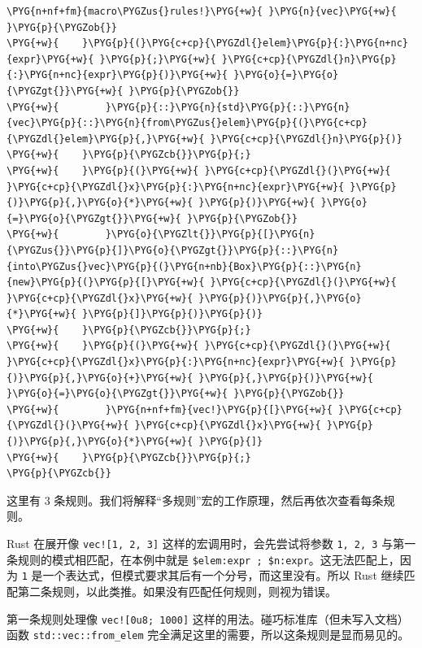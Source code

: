 \begin{Verbatim}[commandchars=\\\{\},breaklines=true,breakanywhere=true,fontsize=\codefont,xleftmargin=17bp]
\PYG{n+nf+fm}{macro\PYGZus{}rules!}\PYG{+w}{ }\PYG{n}{vec}\PYG{+w}{ }\PYG{p}{\PYGZob{}}
\PYG{+w}{    }\PYG{p}{(}\PYG{c+cp}{\PYGZdl{}elem}\PYG{p}{:}\PYG{n+nc}{expr}\PYG{+w}{ }\PYG{p}{;}\PYG{+w}{ }\PYG{c+cp}{\PYGZdl{}n}\PYG{p}{:}\PYG{n+nc}{expr}\PYG{p}{)}\PYG{+w}{ }\PYG{o}{=}\PYG{o}{\PYGZgt{}}\PYG{+w}{ }\PYG{p}{\PYGZob{}}
\PYG{+w}{        }\PYG{p}{::}\PYG{n}{std}\PYG{p}{::}\PYG{n}{vec}\PYG{p}{::}\PYG{n}{from\PYGZus{}elem}\PYG{p}{(}\PYG{c+cp}{\PYGZdl{}elem}\PYG{p}{,}\PYG{+w}{ }\PYG{c+cp}{\PYGZdl{}n}\PYG{p}{)}
\PYG{+w}{    }\PYG{p}{\PYGZcb{}}\PYG{p}{;}
\PYG{+w}{    }\PYG{p}{(}\PYG{+w}{ }\PYG{c+cp}{\PYGZdl{}(}\PYG{+w}{ }\PYG{c+cp}{\PYGZdl{}x}\PYG{p}{:}\PYG{n+nc}{expr}\PYG{+w}{ }\PYG{p}{)}\PYG{p}{,}\PYG{o}{*}\PYG{+w}{ }\PYG{p}{)}\PYG{+w}{ }\PYG{o}{=}\PYG{o}{\PYGZgt{}}\PYG{+w}{ }\PYG{p}{\PYGZob{}}
\PYG{+w}{        }\PYG{o}{\PYGZlt{}}\PYG{p}{[}\PYG{n}{\PYGZus{}}\PYG{p}{]}\PYG{o}{\PYGZgt{}}\PYG{p}{::}\PYG{n}{into\PYGZus{}vec}\PYG{p}{(}\PYG{n+nb}{Box}\PYG{p}{::}\PYG{n}{new}\PYG{p}{(}\PYG{p}{[}\PYG{+w}{ }\PYG{c+cp}{\PYGZdl{}(}\PYG{+w}{ }\PYG{c+cp}{\PYGZdl{}x}\PYG{+w}{ }\PYG{p}{)}\PYG{p}{,}\PYG{o}{*}\PYG{+w}{ }\PYG{p}{]}\PYG{p}{)}\PYG{p}{)}
\PYG{+w}{    }\PYG{p}{\PYGZcb{}}\PYG{p}{;}
\PYG{+w}{    }\PYG{p}{(}\PYG{+w}{ }\PYG{c+cp}{\PYGZdl{}(}\PYG{+w}{ }\PYG{c+cp}{\PYGZdl{}x}\PYG{p}{:}\PYG{n+nc}{expr}\PYG{+w}{ }\PYG{p}{)}\PYG{p}{,}\PYG{o}{+}\PYG{+w}{ }\PYG{p}{,}\PYG{p}{)}\PYG{+w}{ }\PYG{o}{=}\PYG{o}{\PYGZgt{}}\PYG{+w}{ }\PYG{p}{\PYGZob{}}
\PYG{+w}{        }\PYG{n+nf+fm}{vec!}\PYG{p}{[}\PYG{+w}{ }\PYG{c+cp}{\PYGZdl{}(}\PYG{+w}{ }\PYG{c+cp}{\PYGZdl{}x}\PYG{+w}{ }\PYG{p}{)}\PYG{p}{,}\PYG{o}{*}\PYG{+w}{ }\PYG{p}{]}
\PYG{+w}{    }\PYG{p}{\PYGZcb{}}\PYG{p}{;}
\PYG{p}{\PYGZcb{}}
\end{Verbatim}

这里有 3 条规则。我们将解释“多规则”宏的工作原理，然后再依次查看每条规则。

Rust 在展开像 \texttt{vec![1, 2, 3]} 这样的宏调用时，会先尝试将参数 \texttt{1, 2, 3} 与第一条规则的模式相匹配，在本例中就是 \texttt{\$elem:expr ; \$n:expr}。这无法匹配上，因为 \texttt{1} 是一个表达式，但模式要求其后有一个分号，而这里没有。所以 Rust 继续匹配第二条规则，以此类推。如果没有匹配任何规则，则视为错误。

第一条规则处理像 \texttt{vec![0u8; 1000]} 这样的用法。碰巧标准库（但未写入文档）函数 \texttt{std::vec::from\_elem} 完全满足这里的需要，所以这条规则是显而易见的。

